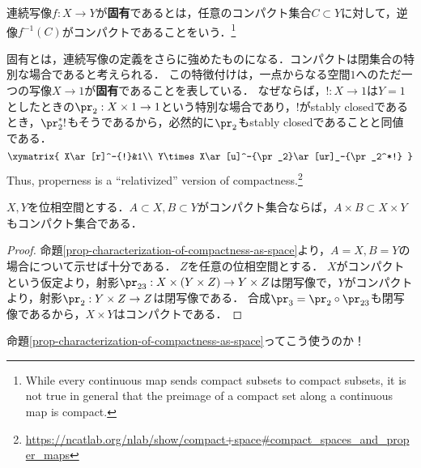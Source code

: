 \documentclass[uplatex,dvipdfmx]{jsreport}
\begin{document}
\begin{definition}
    連続写像$f:X\to Y$が\textbf{固有}であるとは，任意のコンパクト集合$C\subset Y$に対して，逆像$f^{-1}(C)$がコンパクトであることをいう．\footnote{While every continuous map sends compact subsets to compact subsets, it is not true in general that the preimage of a compact set along a continuous map is compact.}
\end{definition}
\begin{remark}[コンパクト性の終対象の言葉による特徴付け]
    固有とは，連続写像の定義をさらに強めたものになる．コンパクトは閉集合の特別な場合であると考えられる．
    この特徴付けは，一点からなる空間$1$へのただ一つの写像$X\to 1$が\textbf{固有}であることを表している．
    なぜならば，$!:X\to 1$は$Y=1$としたときの$\pr_2:X\times 1\to 1$という特別な場合であり，$!$がstably closedであるとき，$\pr_2^*!$もそうであるから，必然的に$\pr_2$もstably closedであることと同値である．
    \[\xymatrix{
        X\ar[r]^-{!}&1\\
        Y\times X\ar[u]^-{\pr_2}\ar[ur]_-{\pr_2^*!}
    }\]
    Thus, properness is a “relativized” version of compactness.\footnote{\url{https://ncatlab.org/nlab/show/compact+space\#compact_spaces_and_proper_maps}}
\end{remark}

\begin{corollary}[積もコンパクト]\label{cor-product-of-compact-sets-is-compact}
    $X,Y$を位相空間とする．$A\subset X,B\subset Y$がコンパクト集合ならば，$A\times B\subset X\times Y$もコンパクト集合である．
\end{corollary}
\begin{proof}
    命題\ref{prop-characterization-of-compactness-as-space}より，$A=X,B=Y$の場合について示せば十分である．
    $Z$を任意の位相空間とする．
    $X$がコンパクトという仮定より，射影$\pr_{23}:X\times(Y\times Z)\to Y\times Z$は閉写像で，$Y$がコンパクトより，射影$\pr_2:Y\times Z\to Z$は閉写像である．
    合成$\pr_3=\pr_2\circ\pr_{23}$も閉写像であるから，$X\times Y$はコンパクトである．
\end{proof}
\begin{remarks}
    命題\ref{prop-characterization-of-compactness-as-space}ってこう使うのか！
\end{remarks}
\end{document}
